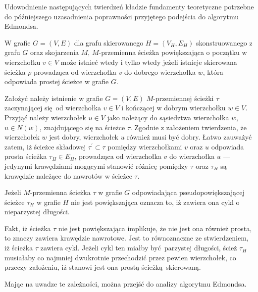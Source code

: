 {  Udowodnienie następujących twierdzeń kładzie fundamenty teoretyczne potrzebne do późniejszego uzasadnienia poprawności przyjętego podejścia do algorytmu Edmondsa.
  \begin{theorem}
    W grafie $G=(V, E)$ dla grafu skierowanego $H=(V_H,E_H)$ skonstruowanego z grafu $G$ oraz skojarzenia $M$, $M$-przemienna ścieżka powiększająca o początku w wierzchołku $v \in V$ może istnieć wtedy i tylko wtedy jeżeli istnieje skierowana ścieżka $\rho$ prowadząca od wierzchołka $v$ do dobrego wierzchołka $w$, która odpowiada prostej ścieżce w grafie $G$.
  \end{theorem}
  \begin{bproof}
    Założyć należy istnienie w grafie $G=(V, E)$ $M$-przemiennej ścieżki $\tau$ zaczynającej się od wierzchołka $v \in V$ i kończącej w dobrym wierzchołku $w \in V$. Przyjąć należy wierzchołek $u \in V$ jako należący do sąsiedztwa wierzchołka $w$, $u \in N(w)$, znajdującego się na ścieżce $\tau$.
    Zgodnie z założeniem twierdzenia, że wierzchołek $w$ jest dobry, wierzchołek $u$ również musi być dobry.
    Łatwo zauważyć zatem, iż ścieżce składowej $\tau^\prime \subset \tau$ pomiędzy wierzchołkami $v$ oraz $u$ odpowiada prosta ścieżka $\tau_H \in E_H$, prowadząca od wierzchołka $v$ do wierzchołka $u$ --- jedynymi krawędziami mogącymi stanowić różnicę pomiędzy $\tau$ oraz $\tau_H$ są krawędzie należące do nawrotów w ścieżce $\tau$.
  \end{bproof}
  \begin{theorem}
    Jeżeli $M$-przemienna ścieżka $\tau$ w grafie $G$ odpowiadająca pseudopowiększającej ścieżce $\tau_H$ w grafie $H$ nie jest powiększająca oznacza to, iż zawiera ona cykl o nieparzystej długości.
  \end{theorem}
  \begin{bproof}
    Fakt, iż ścieżka $\tau$ nie jest powiększająca implikuje, że nie jest ona również prosta, to znaczy zawiera krawędzie nawrotowe.
    Jest to równoznaczne ze stwierdzeniem, iż ścieżka $\tau$ zawiera cykl.
    Jeżeli cykl ten miałby być parzystej długości, ścież $\tau_H$ musiałaby co najmniej dwukrotnie przechodzić przez pewien wierzchołek, co przeczy założeniu, iż stanowi jest ona prostą ścieżką skierowaną.
  \end{bproof}
  Mając na uwadze te zależności, można przejść do analizy algorytmu Edmondsa.
}
